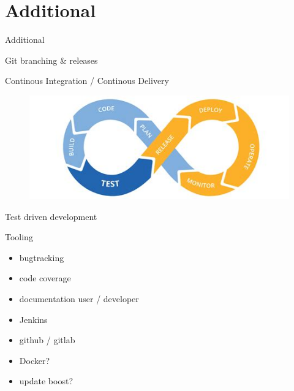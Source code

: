 \documentclass{beamer}
\newcommand{\sectiontitle}[1]{
    \section{#1}
    \begin{frame}
        \centering
        \Huge{#1}
    \end{frame}
}
\begin{document}
    \sectiontitle{Additional}
    \begin{frame}{Git branching \& releases}
    \end{frame}
    \begin{frame}{Continous Integration / Continous Delivery}
        \centering
        \begin{figure}
            \includegraphics[width=12cm]{./images/cicd.jpeg}
        \end{figure}
    \end{frame}
    \begin{frame}{Test driven development}
        \centering
    \end{frame}

    \begin{frame}{Tooling}
        \begin{itemize}
            \item bugtracking
            \item code coverage
            \item documentation user / developer
            \item Jenkins
            \item github / gitlab
            \item Docker?
            \item update boost?
        \end{itemize}
    \end{frame}
\end{document}
